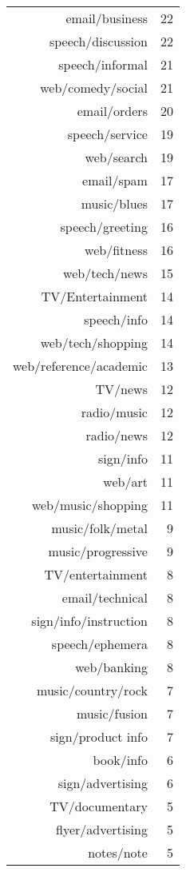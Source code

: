 \begin{table}[ht]
\begin{tabular}{rr}
      email/business &  22 \\ 
      speech/discussion &  22 \\ 
      speech/informal &  21 \\ 
      web/comedy/social &  21 \\ 
      email/orders &  20 \\ 
      speech/service &  19 \\ 
      web/search &  19 \\ 
      email/spam &  17 \\ 
      music/blues &  17 \\ 
      speech/greeting &  16 \\ 
      web/fitness &  16 \\ 
      web/tech/news &  15 \\ 
      TV/Entertainment &  14 \\ 
      speech/info &  14 \\ 
      web/tech/shopping &  14 \\ 
      web/reference/academic &  13 \\ 
      TV/news &  12 \\ 
      radio/music &  12 \\ 
      radio/news &  12 \\ 
      sign/info &  11 \\ 
      web/art &  11 \\ 
      web/music/shopping &  11 \\ 
      music/folk/metal &   9 \\ 
      music/progressive &   9 \\ 
      TV/entertainment &   8 \\ 
      email/technical &   8 \\ 
      sign/info/instruction &   8 \\ 
      speech/ephemera &   8 \\ 
      web/banking &   8 \\ 
      music/country/rock &   7 \\ 
      music/fusion &   7 \\ 
      sign/product info &   7 \\ 
      book/info &   6 \\ 
      sign/advertising &   6 \\ 
      TV/documentary &   5 \\ 
      flyer/advertising &   5 \\ 
      notes/note &   5 \\ 

\end{tabular}
\end{table}
